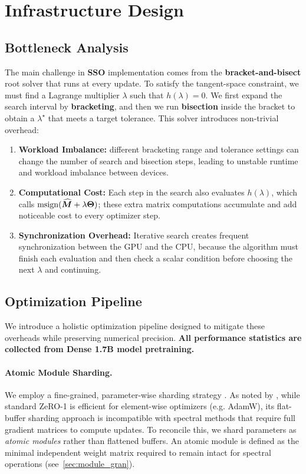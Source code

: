 \section{Infrastructure Design}
\label{sec:system}
\subsection{Bottleneck Analysis}

The main challenge in \textbf{SSO} implementation comes from the \textbf{bracket-and-bisect} root solver that runs at every update. To satisfy the tangent-space constraint, we must find a Lagrange multiplier $\lambda$ such that $h(\lambda)=0$. We first expand the search interval by \textbf{bracketing}, and then we run \textbf{bisection} inside the bracket to obtain a $\lambda^{\star}$ that meets a target tolerance. This solver introduces non-trivial overhead:
\begin{enumerate}[left=0pt]
    \item \textbf{Workload Imbalance:} different bracketing range and tolerance settings can change the number of search and bisection steps, leading to unstable runtime and workload imbalance between devices.
    \item \textbf{Computational Cost:} Each step in the search also evaluates $h(\lambda)$, which calls $\operatorname{msign}(\widehat{{\bm{M}}}+\lambda{\bm{\Theta}})$; these extra matrix computations accumulate and add noticeable cost to every optimizer step.
    \item \textbf{Synchronization Overhead:} Iterative search creates frequent synchronization between the GPU and the CPU, because the algorithm must finish each evaluation and then check a scalar condition before choosing the next $\lambda$ and continuing.
\end{enumerate}

\subsection{Optimization Pipeline}

We introduce a holistic optimization pipeline designed to mitigate these overheads while preserving numerical precision. \textbf{All performance statistics are collected from Dense 1.7B model pretraining.}

\paragraph{Atomic Module Sharding.}
We employ a fine-grained, parameter-wise sharding strategy \citep{emergeing_optimizer}. As noted by \citep{liu2025muonscalablellmtraining}, while standard ZeRO-1 is efficient for element-wise optimizers (e.g. AdamW), its flat-buffer sharding approach is incompatible with spectral methods that require full gradient matrices to compute updates. To reconcile this, we shard parameters as \emph{atomic modules} rather than flattened buffers. An atomic module is defined as the minimal independent weight matrix required to remain intact for spectral operations (see~\cref{sec:module_gran}).

